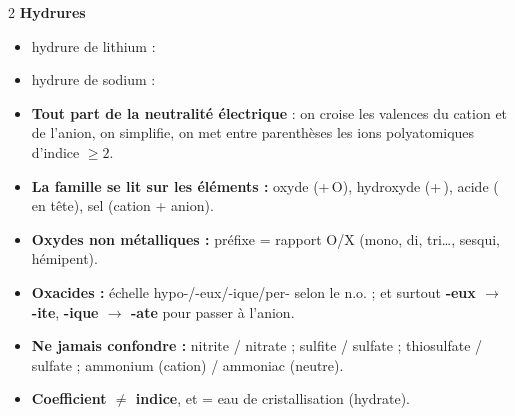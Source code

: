 \documentclass[11pt,a4paper]{article}
\begin{document}
\begin{multicols}{2}
\textbf{Hydrures}
\begin{itemize}
  \item hydrure de lithium : 
  \item hydrure de sodium : 
\end{itemize}
\end{multicols}

\vspace{0.3cm}
\begin{tcolorbox}[boxbase,colback=primary!6,colframe=primary,
   title={\textsc{L'essentiel à retenir}}]
\begin{itemize}[leftmargin=1.4em,topsep=2pt,itemsep=2pt]
  \item \textbf{Tout part de la neutralité électrique} : on croise les valences du cation et de l'anion,
        on simplifie, on met entre parenthèses les ions polyatomiques d'indice $\geq 2$.
  \item \textbf{La famille se lit sur les éléments :} oxyde (+\,O), hydroxyde (+\,),
        acide ( en tête), sel (cation + anion).
  \item \textbf{Oxydes non métalliques :} préfixe = rapport O/X (mono, di, tri\ldots, sesqui, hémipent).
  \item \textbf{Oxacides :} échelle hypo-/-eux/-ique/per- selon le n.o. ; et surtout
        \textbf{-eux $\to$ -ite}, \textbf{-ique $\to$ -ate} pour passer à l'anion.
  \item \textbf{Ne jamais confondre :} nitrite  / nitrate  ; sulfite  /
        sulfate  ; thiosulfate  / sulfate ; ammonium  (cation) / ammoniac
         (neutre).
  \item \textbf{Coefficient $\neq$ indice}, et  = eau de cristallisation (hydrate).
\end{itemize}
\end{tcolorbox}
\end{document}
